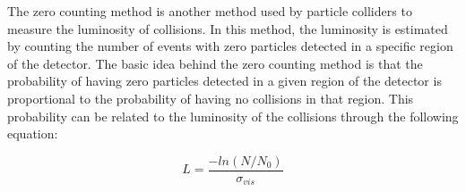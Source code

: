 \begin{itemize}
The zero counting method is another method used by particle colliders to measure the luminosity of collisions. In this method, the luminosity is estimated by counting the number of events with zero particles detected in a specific region of the detector. The basic idea behind the zero counting method is that the probability of having zero particles detected in a given region of the detector is proportional to the probability of having no collisions in that region. This probability can be related to the luminosity of the collisions through the following equation:

\begin{equation}
L = \frac{-ln(N/N_0)}{\sigma_{vis}}
\end{equation}


\end{itemize}
